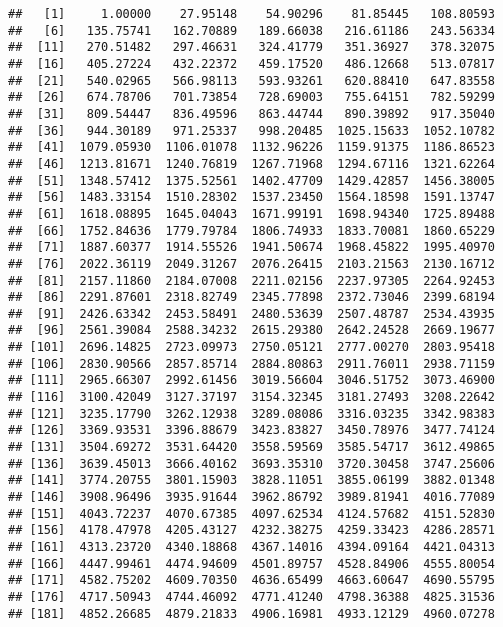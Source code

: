 \documentclass[]{article}
\begin{document}
\begin{verbatim}
##   [1]     1.00000    27.95148    54.90296    81.85445   108.80593
##   [6]   135.75741   162.70889   189.66038   216.61186   243.56334
##  [11]   270.51482   297.46631   324.41779   351.36927   378.32075
##  [16]   405.27224   432.22372   459.17520   486.12668   513.07817
##  [21]   540.02965   566.98113   593.93261   620.88410   647.83558
##  [26]   674.78706   701.73854   728.69003   755.64151   782.59299
##  [31]   809.54447   836.49596   863.44744   890.39892   917.35040
##  [36]   944.30189   971.25337   998.20485  1025.15633  1052.10782
##  [41]  1079.05930  1106.01078  1132.96226  1159.91375  1186.86523
##  [46]  1213.81671  1240.76819  1267.71968  1294.67116  1321.62264
##  [51]  1348.57412  1375.52561  1402.47709  1429.42857  1456.38005
##  [56]  1483.33154  1510.28302  1537.23450  1564.18598  1591.13747
##  [61]  1618.08895  1645.04043  1671.99191  1698.94340  1725.89488
##  [66]  1752.84636  1779.79784  1806.74933  1833.70081  1860.65229
##  [71]  1887.60377  1914.55526  1941.50674  1968.45822  1995.40970
##  [76]  2022.36119  2049.31267  2076.26415  2103.21563  2130.16712
##  [81]  2157.11860  2184.07008  2211.02156  2237.97305  2264.92453
##  [86]  2291.87601  2318.82749  2345.77898  2372.73046  2399.68194
##  [91]  2426.63342  2453.58491  2480.53639  2507.48787  2534.43935
##  [96]  2561.39084  2588.34232  2615.29380  2642.24528  2669.19677
## [101]  2696.14825  2723.09973  2750.05121  2777.00270  2803.95418
## [106]  2830.90566  2857.85714  2884.80863  2911.76011  2938.71159
## [111]  2965.66307  2992.61456  3019.56604  3046.51752  3073.46900
## [116]  3100.42049  3127.37197  3154.32345  3181.27493  3208.22642
## [121]  3235.17790  3262.12938  3289.08086  3316.03235  3342.98383
## [126]  3369.93531  3396.88679  3423.83827  3450.78976  3477.74124
## [131]  3504.69272  3531.64420  3558.59569  3585.54717  3612.49865
## [136]  3639.45013  3666.40162  3693.35310  3720.30458  3747.25606
## [141]  3774.20755  3801.15903  3828.11051  3855.06199  3882.01348
## [146]  3908.96496  3935.91644  3962.86792  3989.81941  4016.77089
## [151]  4043.72237  4070.67385  4097.62534  4124.57682  4151.52830
## [156]  4178.47978  4205.43127  4232.38275  4259.33423  4286.28571
## [161]  4313.23720  4340.18868  4367.14016  4394.09164  4421.04313
## [166]  4447.99461  4474.94609  4501.89757  4528.84906  4555.80054
## [171]  4582.75202  4609.70350  4636.65499  4663.60647  4690.55795
## [176]  4717.50943  4744.46092  4771.41240  4798.36388  4825.31536
## [181]  4852.26685  4879.21833  4906.16981  4933.12129  4960.07278

\end{verbatim}
\end{document}
